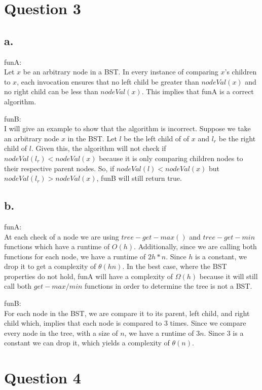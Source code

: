 \documentclass[12pt]{article}
\begin{document}
\section{Question 3}

\subsection{a.}

funA:\\
Let $x$ be an arbitrary node in a BST. In every instance of comparing $x$'s children to $x$, each invocation ensures that no left child be greater than $nodeVal(x)$ and no right child can be less than $nodeVal(x)$. This implies that funA is a correct algorithm.

funB:\\
I will give an example to show that the algorithm is incorrect. Suppose we take an arbitrary node $x$ in the BST. Let $l$ be the left child of of $x$ and $l_r$ be the right child of $l$. Given this, the algorithm will not check if $nodeVal(l_r) < nodeVal(x)$ because it is only comparing children nodes to their respective parent nodes. So, if $nodeVal(l) < nodeVal(x)$ but $nodeVal(l_r) > nodeVal(x)$, funB will still return true.

\subsection{b.}

funA: \\
At each check of a node we are using $tree-get-max()$ and $tree-get-min$ functions which have a runtime of $O(h)$.  Additionally, since we are calling both functions for each node, we have a runtime of $2h * n$. Since $h$ is a constant, we drop it to get a complexity of $\theta(hn)$. In the best case, where the BST properties do not hold, funA will have a complexity of $\Omega(h)$ because it will still call both $get-max/min$ functions in order to determine the tree is not a BST. 

funB:\\
For each node in the BST, we are compare it to its parent, left child, and right child which, implies that each node is compared to $3$ times. Since we compare every node in the tree, with a size of $n$, we have a runtime of $3n$. Since $3$ is a constant we can drop it, which yields a complexity of $\theta(n)$.

\section{Question 4}
\end{document}
